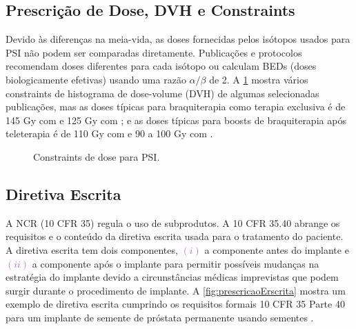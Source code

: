 \documentclass[11pt,a4paper]{article}
\newcounter{exemplo}
\begin{document}
\subsection*{Prescrição de Dose, DVH e Constraints}

	Devido às diferenças na meia-vida, as doses fornecidas pelos isótopos usados para PSI não podem ser comparadas diretamente. Publicações e protocolos recomendam doses diferentes para cada isótopo ou calculam BEDs (doses biologicamente efetivas) usando uma razão $\alpha/\beta$ de 2. A \ref{fig:constraintProstata} mostra vários constraints de histograma de dose-volume (DVH) de algumas selecionadas publicações, mas as doses típicas para braquiterapia como terapia exclusiva é de 145 Gy com  e 125 Gy com ; e as doses típicas para boosts de braquiterapia após teleterapia é de 110 Gy com  e 90 a 100 Gy com .

	\begin{figure}[h]
		\centering
		\caption{Constraints de dose para PSI.}
		\label{fig:constraintProstata}
	\end{figure}

\subsection*{Diretiva Escrita}

	A NCR (10 CFR 35) regula o uso de subprodutos. A 10 CFR 35.40 abrange os requisitos e o conteúdo da diretiva escrita usada para o tratamento do paciente. A diretiva escrita tem dois componentes, \textcolor{MediumOrchid}{$(i)$} a componente antes do implante e \textcolor{MediumOrchid}{$(ii)$} a componente após o implante para permitir possíveis mudanças na estratégia do implante devido a circunstâncias médicas imprevistas que podem surgir durante o procedimento de implante. A \ref{fig:prescricaoErscrita} mostra um exemplo de diretiva escrita cumprindo os requisitos formais 10 CFR 35 Parte 40 para um implante de semente de próstata permanente usando sementes .
\end{document}

